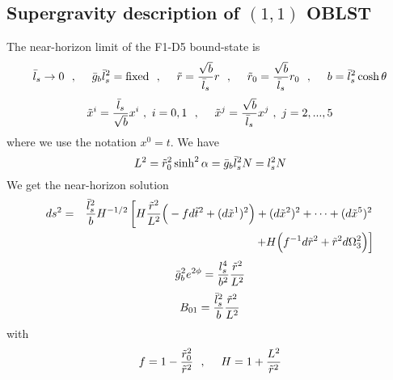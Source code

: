 \documentclass[a4paper,twoside,titlepage,12pt]{article}
\begin{document}
\subsection{Supergravity description of $(1,1)$ OBLST}
\label{secSupOB11}

The near-horizon limit of the F1-D5 bound-state is 
\cite{Gopakumar:2000na,Harmark:2000wv}
%
\begin{equation}
\bar{l}_s \rightarrow 0 \ \ ,\ \ \ \ 
\bar{g}_b \bar{l}_s^2 = \mbox{fixed} \ \ ,\ \ \ \ 
\tilde{r} = \frac{\sqrt{b}}{\bar{l}_s} r \ \ ,\ \ \ \ 
\tilde{r}_0 = \frac{\sqrt{b}}{\bar{l}_s} r_0 \ \ ,\ \ \ \ 
b = \bar{l}_s^2 \cosh \theta
\end{equation}
%
\begin{equation}
\tilde{x}^i = \frac{\lsb}{\sqrt{b}} x^i \ , \ i=0,1 \spa
\tilde{x}^j = \frac{\sqrt{b}}{\lsb} x^j \ , \ j=2,...,5 
\end{equation}
%
where we use the notation \( x^0 = t \).
We have
%
\begin{equation}
L^2 = \tilde{r}_0^2 \sinh^2 \alpha = \bar{g}_b \bar{l}_s^2 N = l_s^2 N
\end{equation}
%
We get the near-horizon solution \cite{Harmark:2000wv}
%
\begin{eqnarray}
\label{NHF1D5met}
ds^2 &=& \frac{\bar{l}_s^2}{b} H^{-1/2} \left[ H \frac{\tilde{r}^2}{L^2} 
\Big( - f d\tilde{t}^2 + (d\tilde{x}^1)^2 \Big)
+ (d\tilde{x}^2)^2 + \cdots + (d\tilde{x}^5)^2 
\right. \nonumber \\ && \left.
+ H \Big( f^{-1} d\tilde{r}^2 + \tilde{r}^2 d\Omega_3^2 \Big) \right]
\end{eqnarray}
%
\begin{equation}
\label{NHF1D5dil}
\bar{g}_b^2 e^{2\phi} 
= \frac{l_s^4}{b^2} \frac{\tilde{r}^2}{L^2}
\end{equation}
%
\begin{equation}
\label{NHF1D5pot}
B_{01} = \frac{\bar{l}_s^2}{b} \frac{\tilde{r}^2}{L^2}
\end{equation}
%
with
%
\begin{equation}
\label{NHF1D5defs}
f = 1 - \frac{\tilde{r}_0^2}{\tilde{r}^2} \ \ ,\ \ \ \ 
H = 1 + \frac{L^2}{\tilde{r}^2}
\end{equation}
%
\end{document}
